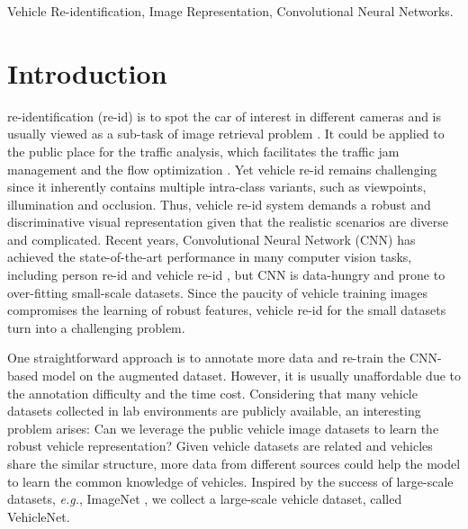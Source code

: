 \documentclass[journal]{IEEEtran}
\def\eg{\emph{e.g.}}
\begin{document}
\begin{IEEEkeywords}
Vehicle Re-identification, Image Representation, Convolutional Neural Networks.
\end{IEEEkeywords}

\IEEEpeerreviewmaketitle

\section{Introduction}
 re-identification (re-id) is to spot the car of interest in different cameras and is usually viewed as a sub-task of image retrieval problem \cite{zheng2019joint}. It could be applied to the public place for the traffic analysis, which facilitates the traffic jam management and the flow optimization \cite{tang@cityflow}. Yet vehicle re-id remains challenging since it inherently contains multiple intra-class variants, such as viewpoints, illumination and occlusion. 
Thus, vehicle re-id system demands a robust and discriminative visual representation given that the realistic scenarios are diverse and complicated. 
Recent years, Convolutional Neural Network (CNN) has achieved the state-of-the-art performance in many computer vision tasks, including person re-id \cite{sun2017beyond,sun2017svdnet,zheng2018pedestrian} and vehicle re-id \cite{liu2016deep,zhou2018aware,wang2017orientation}, but CNN is data-hungry and prone to over-fitting small-scale datasets. Since the paucity of vehicle training images compromises the learning of robust features, vehicle re-id for the small datasets turn into a challenging problem.

One straightforward approach is to annotate more data and re-train the CNN-based model on the augmented dataset. However, it is usually unaffordable due to the annotation difficulty and the time cost. Considering that many vehicle datasets collected in lab environments are publicly available, an interesting problem arises: Can we leverage the public vehicle image datasets to learn the robust vehicle representation? Given vehicle datasets are related and vehicles share the similar structure, more data from different sources could help the model to learn the common knowledge of vehicles. Inspired by the success of large-scale datasets, \eg, ImageNet \cite{deng2009imagenet}, we collect a large-scale vehicle dataset, called VehicleNet.
\end{document}

